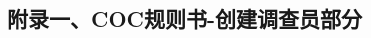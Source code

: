 \documentclass[a4paper,UTF8]{article}
\theoremstyle{definition}
\begin{document}
\begin{CJK}{UTF8}{gkai}
\begin{flushleft}
\begin{CJK*}{UTF8}{gbsn}
\section*{附录一、COC规则书-创建调查员部分}
\end{CJK*}
\end{flushleft}




\end{CJK}
\end{document}
